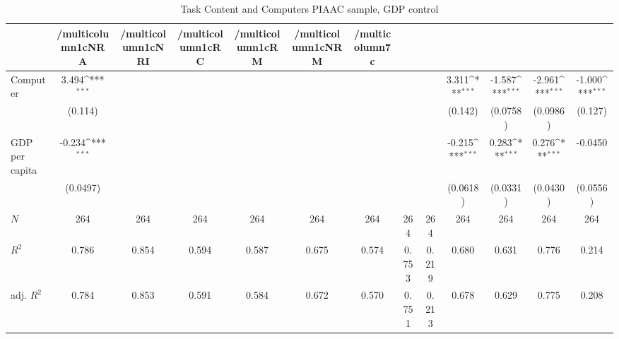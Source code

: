 \begin{table}[htbp]\centering
\def\sym#1{\ifmmode^{#1}\else\(^{#1}\)\fi}
\caption{Task Content and Computers PIAAC sample, GDP control}
\begin{tabular}{l*{12}{c}}
\hline\hline
            &/multicolumn{1}{c}{NRA}&/multicolumn{1}{c}{NRI}&/multicolumn{1}{c}{RC}&/multicolumn{1}{c}{RM}&/multicolumn{1}{c}{NRM}&/multicolumn{7}{c}{}                                                                                                                                     \\
\hline
Computer    &       3.494\sym{***}&                     &                     &                     &                     &                     &                     &                     &       3.311\sym{***}&      -1.587\sym{***}&      -2.961\sym{***}&      -1.000\sym{***}\\
            &     (0.114)         &                     &                     &                     &                     &                     &                     &                     &     (0.142)         &    (0.0758)         &    (0.0986)         &     (0.127)         \\
[1em]
GDP per capita&      -0.234\sym{***}&                     &                     &                     &                     &                     &                     &                     &      -0.215\sym{***}&       0.283\sym{***}&       0.276\sym{***}&     -0.0450         \\
            &    (0.0497)         &                     &                     &                     &                     &                     &                     &                     &    (0.0618)         &    (0.0331)         &    (0.0430)         &    (0.0556)         \\
\hline
\(N\)       &         264         &         264         &         264         &         264         &         264         &         264         &         264         &         264         &         264         &         264         &         264         &         264         \\
\(R^{2}\)   &       0.786         &       0.854         &       0.594         &       0.587         &       0.675         &       0.574         &       0.753         &       0.219         &       0.680         &       0.631         &       0.776         &       0.214         \\
adj. \(R^{2}\)&       0.784         &       0.853         &       0.591         &       0.584         &       0.672         &       0.570         &       0.751         &       0.213         &       0.678         &       0.629         &       0.775         &       0.208         \\
\hline\hline
\end{tabular}
\end{table}
